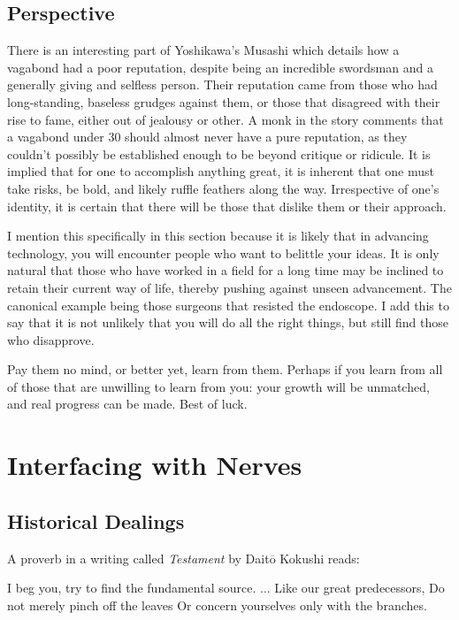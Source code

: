\documentclass[12pt]{report}
\begin{document}
\section{Perspective}
There is an interesting part of Yoshikawa's Musashi which details how a vagabond had a poor reputation, despite being an incredible swordsman and a generally giving and selfless person. Their reputation came from those who had long-standing, baseless grudges against them, or those that disagreed with their rise to fame, either out of jealousy or other. A monk in the story comments that a vagabond under 30 should almost never have a pure reputation, as they couldn't possibly be established enough to be beyond critique or ridicule. It is implied that for one to accomplish anything great, it is inherent that one must take risks, be bold, and likely ruffle feathers along the way. Irrespective of one's identity, it is certain that there will be those that dislike them or their approach.\newline

I mention this specifically in this section because it is likely that in advancing technology, you will encounter people who want to belittle your ideas. It is only natural that those who have worked in a field for a long time may be inclined to retain their current way of life, thereby pushing against unseen advancement. The canonical example being those surgeons that resisted the endoscope. I add this to say that it is not unlikely that you will do all the right things, but still find those who disapprove.\newline

Pay them no mind, or better yet, learn from them. Perhaps if you learn from all of those that are unwilling to learn from you: your growth will be unmatched, and real progress can be made. Best of luck. 


\chapter{Interfacing with Nerves}

\section{Historical Dealings}

A proverb in a writing called \textit{Testament} by Dait$\overline{\mathrm{o}}$ Kokushi reads:\newline

\hspace*{1cm} I beg you, try to find the fundamental source.\newline
\hspace*{1cm} ...\newline
\hspace*{1cm} Like our great predecessors,\newline 
\hspace*{1cm} Do not merely pinch off the leaves\newline
\hspace*{1cm} Or concern yourselves only with the branches.\newline 
\end{document}
